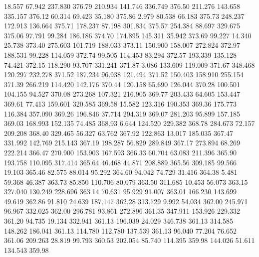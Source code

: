   18.557   67.942  237.830       376.79
 210.934  141.746  336.749       376.50
 211.276  143.658  335.157       376.12
  60.314   69.423   35.180       375.86
   2.979   80.538   66.183       375.73
 248.237  172.913  136.664       375.71
 178.237   87.198  301.834       375.57
 254.384   88.697  329.675       375.06
  97.791   99.284  186.186       374.70
 174.895  145.311   35.942       373.69
  99.227   14.340   25.738       373.40
 275.603  101.719  188.033       373.11
 150.900  158.007  272.824       372.97
 188.531   99.228  114.059       372.74
  99.505  114.453   83.294       372.57
 193.339  135.128   74.421       372.15
 118.290   93.707  331.241       371.87
   3.086  133.609  119.009       371.67
 348.468  120.297  232.278       371.52
 187.234   96.938  121.494       371.52
 150.403  158.910  255.154       371.39
 266.219  114.420  142.176       370.44
 120.158   65.690  126.044       370.28
 100.501  104.155   94.527       370.08
 273.268  107.321  216.905       369.77
 203.433   64.605  153.447       369.61
  77.413  159.601  320.585       369.58
  15.582  123.316  190.353       369.36
 175.773  116.384  357.090       369.26
 196.846   37.714  294.319       369.07
 281.203   95.899  157.185       369.03
 168.993  152.135   74.485       368.93
   6.644  124.520  229.382       368.78
 284.673   72.157  209.208       368.40
 329.465   56.327   63.762       367.92
 122.863   13.017  185.035       367.47
 331.992  142.769  215.143       367.19
 198.287   56.829  289.849       367.17
 273.894   68.269  222.214       366.47
 270.900  153.903  167.593       366.33
  60.704   63.083  211.396       365.90
 193.758  110.095  317.414       365.64
  46.468   44.871  208.889       365.56
 309.185   99.566   19.103       365.46
  82.575   88.014   95.292       364.60
  94.042   74.729   31.416       364.38
   5.481   59.368   46.387       363.73
  85.850  110.706   80.079       363.50
 311.685   10.453   56.073       363.15
 327.040  130.249  228.696       363.14
  70.631   95.929   91.007       363.01
 166.230  143.699   49.619       362.86
  91.810   24.639  187.147       362.28
 313.729    9.992   54.034       362.00
 245.971   96.967  332.025       362.00
 296.781   93.861  272.896       361.35
 347.911  153.926  229.332       361.20
  94.735   19.134  332.941       361.13
 196.039   24.029  346.738       361.13
 314.585  148.262  186.041       361.13
 114.780  112.780  137.539       361.13
  96.040   77.204   76.652       361.06
 209.263   28.819   99.793       360.53
 202.054   85.740  114.395       359.98
 144.026   51.611  134.543       359.98
